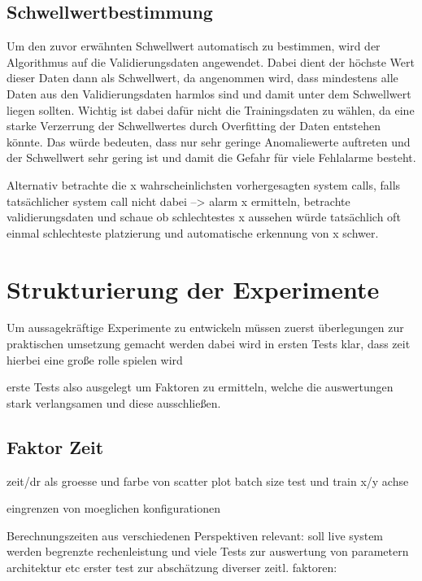     \subsection{Schwellwertbestimmung}
        Um den zuvor erwähnten Schwellwert automatisch zu bestimmen, wird der Algorithmus auf die Validierungsdaten angewendet. 
        Dabei dient der höchste Wert dieser Daten dann als Schwellwert, da angenommen wird, dass mindestens alle Daten aus den Validierungsdaten harmlos sind und damit unter dem Schwellwert liegen sollten.
        Wichtig ist dabei dafür nicht die Trainingsdaten zu wählen, da eine starke Verzerrung der Schwellwertes durch Overfitting der Daten entstehen könnte. 
        Das würde bedeuten, dass nur sehr geringe Anomaliewerte auftreten und der Schwellwert sehr gering ist und damit die Gefahr für viele Fehlalarme besteht.

        Alternativ betrachte die x wahrscheinlichsten vorhergesagten system calls, falls tatsächlicher system call nicht dabei --> alarm
        x ermitteln, betrachte validierungsdaten und schaue ob schlechtestes x aussehen würde
        tatsächlich oft einmal schlechteste platzierung und automatische erkennung von x schwer.

        

\section{Strukturierung der Experimente}
    Um aussagekräftige Experimente zu entwickeln müssen zuerst 
    überlegungen zur praktischen umsetzung gemacht werden
    dabei wird in ersten Tests klar, dass zeit hierbei eine große rolle spielen wird

    erste Tests also ausgelegt um Faktoren zu ermitteln, welche die auswertungen stark verlangsamen
    und diese ausschließen.

    \subsection{Faktor Zeit}

    zeit/dr als groesse und farbe von scatter plot
    batch size test und train x/y achse


    eingrenzen von moeglichen konfigurationen

    Berechnungszeiten aus verschiedenen Perspektiven relevant:
    soll live system werden
    begrenzte rechenleistung und viele Tests zur auswertung von parametern architektur etc
    erster test zur abschätzung diverser zeitl. faktoren:


